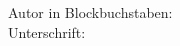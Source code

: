 \documentclass[12pt,a4paper,ngerman]{article}
\begin{document}
%
%
\vspace*{1cm}
%
Autor in Blockbuchstaben:\\					%
Unterschrift: 								%
%
\vspace*{1cm}
%
%

\end{document}

